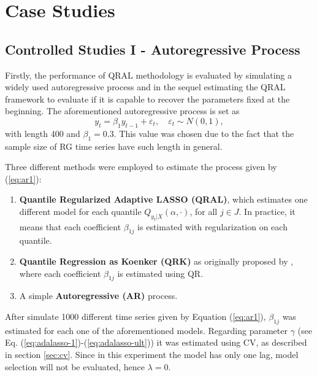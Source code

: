 \section{Case Studies}


\subsection{Controlled Studies I - Autoregressive Process} \label{sec:ar-study}


Firstly, the performance of QRAL methodology is evaluated by simulating a widely used autoregressive process and in the sequel estimating the QRAL framework to evaluate if it is capable to recover the parameters fixed at the beginning. 
The aforementioned autoregressive process is set as
\begin{equation}
y_t = \beta_1 y_{t-1} + \varepsilon_t, \quad \varepsilon_t \sim N(0, 1), \label{eq:ar1}
\end{equation}
with length 400 and $\beta_1 = 0.3$. This value was chosen due to the fact that the sample size of RG time series have such length in general.

Three different methods were employed to estimate the process given by (\ref{eq:ar1}):
\begin{enumerate}
\item \textbf{Quantile Regularized Adaptive LASSO (QRAL)}, which estimates one different model for each quantile $Q_{y_t|X}(\alpha,\cdot)$, for all ${j \in J}$. In practice, it means that each coefficient $\beta_{1j}$ is estimated with regularization on each quantile. %
\item \textbf{Quantile Regression as Koenker (QRK)} as originally proposed by \cite{koenker1978regression}, where each coefficient $\beta_{1j}$ is estimated using QR. 
\item A simple \textbf{Autoregressive (AR)} process.%


\end{enumerate}

After simulate 1000 different time series given by Equation (\ref{eq:ar1}), $\beta_{1j}$ was estimated for each one of the aforementioned models. Regarding parameter $\gamma$ (see Eq. (\ref{eq:adalasso-1})-(\ref{eq:adalasso-ult})) it was estimated using CV, as described in section \ref{sec:cv}. Since in this experiment the model has only one lag, model selection will not be evaluated, hence $\lambda=0$.

